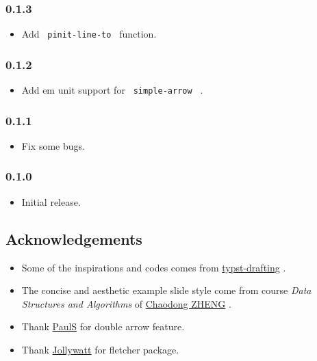 \subsubsection{0.1.3}\label{section-4}

\begin{itemize}
\tightlist
\item
  Add \texttt{\ pinit-line-to\ } function.
\end{itemize}

\subsubsection{0.1.2}\label{section-5}

\begin{itemize}
\tightlist
\item
  Add em unit support for \texttt{\ simple-arrow\ } .
\end{itemize}

\subsubsection{0.1.1}\label{section-6}

\begin{itemize}
\tightlist
\item
  Fix some bugs.
\end{itemize}

\subsubsection{0.1.0}\label{section-7}

\begin{itemize}
\tightlist
\item
  Initial release.
\end{itemize}

\subsection{Acknowledgements}\label{acknowledgements}

\begin{itemize}
\tightlist
\item
  Some of the inspirations and codes comes from
  \href{https://github.com/ntjess/typst-drafting}{typst-drafting} .
\item
  The concise and aesthetic example slide style come from course
  \emph{Data Structures and Algorithms} of
  \href{https://chaodong.me/}{Chaodong ZHENG} .
\item
  Thank \href{https://github.com/psads-git}{PaulS} for double arrow
  feature.
\item
  Thank \href{https://github.com/Jollywatt}{Jollywatt} for fletcher
  package.
\end{itemize}

